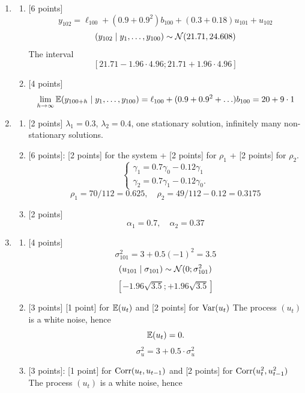 \begin{enumerate}
    \item 
\begin{enumerate}
    \item {[6 points]}
    \[
        y_{102}= \ell_{100} + (0.9 + 0.9^2) b_{100} + (0.3 + 0.18)u_{101} + u_{102}    
        \]
        \[
        (y_{102} \mid y_1, \ldots, y_{100}) \sim \mathcal{N}(21.71, 24.608)    
        \]
        The interval
        \[
        [21.71 - 1.96 \cdot 4.96;21.71 + 1.96 \cdot 4.96]    
        \]
    \item {[4 points]}
    \[
    \lim_{h\to\infty} \operatorname{\mathbb{E}}(y_{100+h} \mid y_1, \ldots, y_{100}) = \ell_{100} + (0.9 + 0.9^2 +\ldots) b_{100} = 20 + 9\cdot 1    
    \]    
\end{enumerate}
\item 
\begin{enumerate}
    \item {[2 points]} $\lambda_1 = 0.3$, $\lambda_2 = 0.4$, one stationary solution, infinitely many non-stationary solutions. 
    \item {[6 points]}: {[2 points] for the system} + {[2 points] for $\rho_1$} + {[2 points] for $\rho_2$}.
    \[
        \begin{cases}
            \gamma_1 = 0.7 \gamma_0  - 0.12 \gamma_1 \\
            \gamma_2 = 0.7 \gamma_1 - 0.12 \gamma_0. 
        \end{cases}
    \]
    \[
    \rho_1 = 70/112 = 0.625, \quad \rho_2 = 49/112 - 0.12 = 0.3175    
    \]
    \item {[2 points]}
    \[
    \alpha_1 = 0.7, \quad \alpha_2 = 0.37    
    \]
\end{enumerate}
\item 
\begin{enumerate}
    \item {[4 points]}
    \[
    \sigma^2_{101} = 3 + 0.5 (-1)^2= 3.5    
    \]
    \[
    (u_{101}\mid \sigma_{101}) \sim \mathcal{N}(0; \sigma^2_{101})    
    \]
    \[
    [-1.96 \sqrt{3.5}; +1.96 \sqrt{3.5}]    
    \]
    \item {[3 points]} {[1 point]} for $\operatorname{\mathbb{E}}(u_t)$ and {[2 points]} for $\operatorname{Var}(u_t)$ 
    The process $(u_t)$ is a white noise, hence
    \[
    \operatorname{\mathbb{E}}(u_t) = 0.    
    \]
    \[
    \sigma^2_u = 3 + 0.5 \cdot \sigma^2_u    
    \]
    \item {[3 points]}: {[1 point]} for $\operatorname{Corr}(u_t, u_{t-1})$ and {[2 points]} for $\operatorname{Corr}(u_t^2, u_{t-1}^2)$ 
    The process $(u_t)$ is a white noise, hence
    \[
\]
\end{enumerate}
\end{enumerate}
